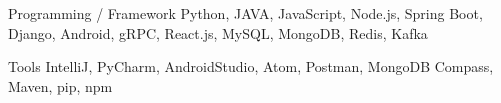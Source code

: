 


\begin{cvskills}


\cvskill
{Programming / Framework} %
{Python, JAVA, JavaScript, Node.js, Spring Boot, Django, Android, gRPC, React.js, MySQL, MongoDB, Redis, Kafka} %


\cvskill
{Tools} %
{IntelliJ, PyCharm, AndroidStudio, Atom, Postman, MongoDB Compass, Maven, pip, npm} %



\end{cvskills}
